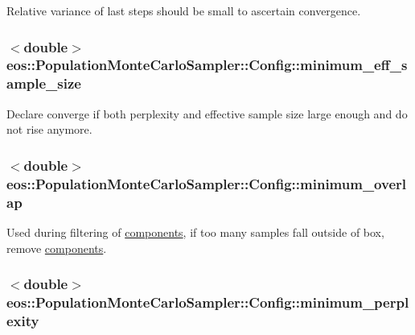 Relative variance of last steps should be small to ascertain convergence. \hypertarget{structeos_1_1PopulationMonteCarloSampler_1_1Config_a765c46a4b99f711c59f02e1ea0d8fbe9}{
\subsubsection[{minimum\_\-eff\_\-sample\_\-size}]{$<$double$>$ {\bf eos::PopulationMonteCarloSampler::Config::minimum\_\-eff\_\-sample\_\-size}}}
\label{structeos_1_1PopulationMonteCarloSampler_1_1Config_a765c46a4b99f711c59f02e1ea0d8fbe9}


Declare converge if both perplexity and effective sample size large enough and do not rise anymore. \hypertarget{structeos_1_1PopulationMonteCarloSampler_1_1Config_a32b76214e4175ec4543162d36707ab84}{
\subsubsection[{minimum\_\-overlap}]{$<$double$>$ {\bf eos::PopulationMonteCarloSampler::Config::minimum\_\-overlap}}}
\label{structeos_1_1PopulationMonteCarloSampler_1_1Config_a32b76214e4175ec4543162d36707ab84}


Used during filtering of \hyperlink{namespaceeos_1_1components}{components}, if too many samples fall outside of box, remove \hyperlink{namespaceeos_1_1components}{components}. \hypertarget{structeos_1_1PopulationMonteCarloSampler_1_1Config_a4cfd93c384604e24e58ace95bdc31a2d}{
\subsubsection[{minimum\_\-perplexity}]{$<$double$>$ {\bf eos::PopulationMonteCarloSampler::Config::minimum\_\-perplexity}}}
\label{structeos_1_1PopulationMonteCarloSampler_1_1Config_a4cfd93c384604e24e58ace95bdc31a2d}


